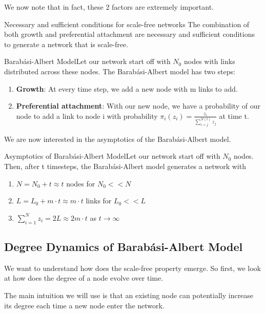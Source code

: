 \documentclass[twoside]{article}
\begin{document}
We now note that in fact, these 2 factors are extremely important.
\begin{theorem_exam}{Necessary and sufficient conditions for scale-free networks}{} The combination of both growth and preferential attachment are necessary and sufficient conditions to generate a network that is scale-free.
\end{theorem_exam}

\begin{theorem_exam}{Barabási-Albert Model}{}Let our network start off with $N_0$ nodes with links distributed across these nodes. The Barabási-Albert model has two steps:
\begin{enumerate}
\item \textbf{Growth}: At every time step, we add a new node with m links to add.
\item \textbf{Preferential attachment}: With our new node, we have a probability of our node to add a link to node i with probability $\pi_i(z_i) = \frac{z_i}{\sum_{i=j}^{N(t)}z_j}$ at time t.
\end{enumerate}
\end{theorem_exam}

We are now interested in the asymptotics of the Barabási-Albert model.

\begin{proposition_exam}{Asymptotics of Barabási-Albert Model}{}Let our network start off with $N_0$ nodes. Then, after t timesteps, the Barabási-Albert model generates a network with
\begin{enumerate}
\item $N = N_0 + t \approx t$ nodes for $N_0 << N$
\item $L = L_0 + m\cdot t \approx m\cdot t$ links for $L_0 << L$
\item $\sum_{i=1}^{N}z_i = 2L \approx 2m\cdot t$ as $t \rightarrow \infty$
\end{enumerate}
\end{proposition_exam}

\subsection{Degree Dynamics of Barabási-Albert Model}
We want to understand how does the scale-free property emerge. So first, we look at how does the degree of a node evolve over time. 

The main intuition we will use is that an existing node can potentially increase its degree each time a new node enter the network. 
\end{document}
